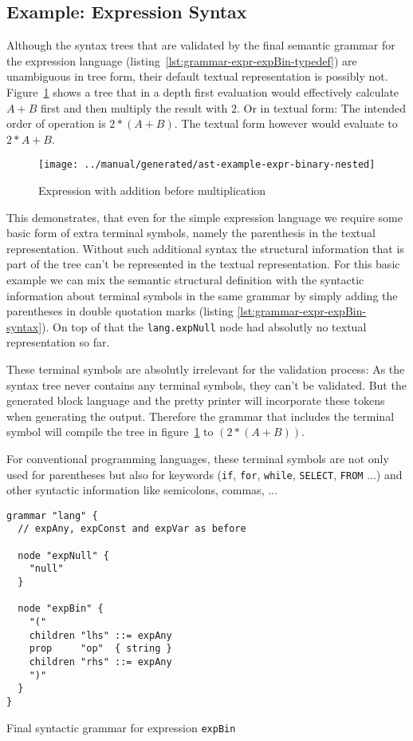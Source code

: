 \documentclass[sigconf,natbib=false,review=true]{acmart}
\newcommand\astScale{0.75}
\begin{document}
\subsection{Example: Expression Syntax}

Although the syntax trees that are validated by the final semantic grammar for the expression language (listing~\ref{lst:grammar-expr-expBin-typedef}) are unambiguous in tree form, their default textual representation is possibly not. Figure~\ref{fig:ast-nested-ambiguous} shows a tree that in a depth first evaluation would effectively calculate $A+B$ first and then multiply the result with $2$. Or in textual form: The intended order of operation is $2 * (A+B)$. The textual form however would evaluate to $2 * A + B$.

\begin{figure}
  \texttt{[image: ../manual/generated/ast-example-expr-binary-nested]}
  \caption{Expression with addition before multiplication}
  \label{fig:ast-nested-ambiguous}
\end{figure}

This demonstrates, that even for the simple expression language we require some basic form of extra terminal symbols, namely the parenthesis in the textual representation. Without such additional syntax the structural information that is part of the tree can't be represented in the textual representation. For this basic example we can mix the semantic structural definition with the syntactic information about terminal symbols in the same grammar by simply adding the parentheses in double quotation marks (listing \ref{lst:grammar-expr-expBin-syntax}). On top of that the \texttt{lang.expNull} node had absolutly no textual representation so far.

These terminal symbols are absolutly irrelevant for the validation process: As the syntax tree never contains any terminal symbols, they can't be validated. But the generated block language and the pretty printer will incorporate these tokens when generating the output. Therefore the grammar that includes the terminal symbol will compile the tree in figure~\ref{fig:ast-nested-ambiguous} to $(2 * (A + B))$.

For conventional programming languages, these terminal symbols are not only used for parentheses but also for keywords (\texttt{if}, \texttt{for}, \texttt{while}, \texttt{SELECT}, \texttt{FROM} ...) and other syntactic information like semicolons, commas, ...

\begin{listing}[H]
\begin{verbatim}
grammar "lang" {
  // expAny, expConst and expVar as before

  node "expNull" {
    "null"
  }

  node "expBin" {
    "("
    children "lhs" ::= expAny
    prop     "op"  { string }
    children "rhs" ::= expAny
    ")"
  }
}
\end{verbatim}
\caption{Final syntactic grammar for expression \texttt{expBin}}
\label{lst:grammar-expr-expBin-syntax}
\end{listing}
\end{document}
